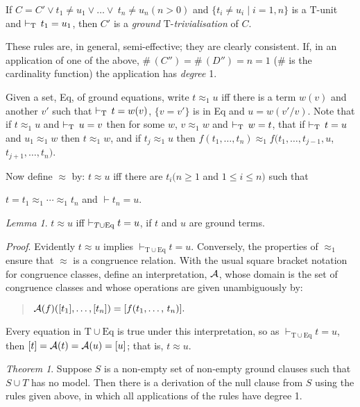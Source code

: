 \documentclass[letterpaper]{report}
\begin{document}
If
$C=C'\lor t_{1}\neq u_{1}\lor\ldots\lor\ t_{n}\neq u_{n}(n>0)$
and $\{t_{i}\neq u_{i}\mid i=1,n\}$ is a $\mathrm{T}$-unit and
$\vdash_{\rm T}\,t_{1}=u_{1}$, then $C'$ is a \emph{ground}
$\mathrm{T}$-\emph{trivialisation} of $C$.

These rules are, in general, semi-effective; they are clearly
consistent. If, in an application of one of the above,
$\#\,(C'')=\#\,(D'')=n=1$ ($\#$ is the
cardinality function) the application has \emph{degree} 1.

Given a set, Eq, of ground equations, write $t\approx_{1}u$ iff there
is a term $w(v)$ and another $v'$ such that
$\vdash_{\rm T}\,t=w(v)$, $\{v=v'\}$ is in Eq and
$u=w(v'/v)$. Note that if $t\approx_{1}u$ and
$\vdash_{\rm T}\,u=v$ then for some $w$, $v\approx_{1}w$ and
$\vdash_{\rm T}\,w=t$, that if $\vdash_{\rm T}\,t=u$ and
$u_{1}\approx_{1}w$ then $t\approx_{1}w$, and if
$t_{j}\approx_{1}u$ then
$f(t_{1},\ldots,t_{n})\approx_{1}f(t_{1},\ldots, t_{j-1},u$,
$t_{j+1},\ldots, t_{n})$.

Now define $\approx$ by: $t\approx u$ iff there are
$t_{i}(n\geqslant 1$ and $1\leqslant i\leqslant n)$ such that

$t=t_{1}\approx_{1}\cdots\approx_{1}t_{n}$ and $\vdash t_{n}=u$.

\noindent
\emph{Lemma 1}. $t \approx u$ iff
$\vdash_{T\cup\mbox{\scriptsize Eq}}t = u$, if $t$ and $u$ are
ground terms.

\noindent
\emph{Proof}. Evidently $t \approx u$ implies
$\vdash_{\mathrm{T} \cup \mathrm{Eq}}t = u$. Conversely, the
properties of $\approx_{1}$ ensure that $\approx$ is a congruence
relation. With the usual square bracket notation for congruence classes,
define an interpretation, $\cal A$, whose domain is the set of
congruence classes and whose operations are given unambiguously by:
\begin{quote}
${\cal A}(f)([t_{1}],\ldots,[t_{n}]) = [f(t_{1},\ldots,\,t_{n})].$
\end{quote}

Every equation in $\mathrm{T}\cup \mathrm{Eq}$ is true under this
interpretation, so as $\vdash_{\mathrm{T} \cup \mathrm{Eq}} t = u$,
then $[t] = {\cal A}(t) = {\cal A}(u) = [u]$; that is,
$t \approx u$.

\noindent
\emph{Theorem 1}. Suppose $S$ is a non-empty set of non-empty ground
clauses such that $S\cup T$ has no model. Then there is a derivation
of the null clause from $S$ using the rules given above, in which all
applications of the rules have degree 1.
\end{document}
